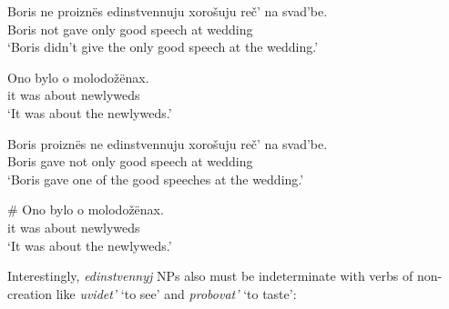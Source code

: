 \begin{exe}
	\ex \begin{xlist}
		\ex \gll Boris ne proizn\"{e}s edinstvennuju xoro\v{s}uju re\v{c}' na svad'be.\\
		Boris not gave only good speech at wedding\\
		\glt `Boris didn't give the only good speech at the wedding.'

		\ex \gll Ono bylo o molodo\v{z}\"{e}nax.\\
		it was about newlyweds\\
		\glt `It was about the newlyweds.'
	\end{xlist}

	\ex \label{boris3} \begin{xlist}
		\ex \gll Boris proizn\"{e}s ne edinstvennuju xoro\v{s}uju re\v{c}' na svad'be.\\
		Boris gave not only good speech at wedding\\
		\glt `Boris gave one of the good speeches at the wedding.'

		\ex \gll \# Ono bylo o molodo\v{z}\"{e}nax.\\
		{} it was about newlyweds\\
		\glt `It was about the newlyweds.'
	\end{xlist}
\end{exe}

Interestingly, \textit{edinstvennyj} NPs also must be indeterminate with verbs of non-creation like \textit{uvidet'} `to see' and \textit{probovat'} `to taste':

